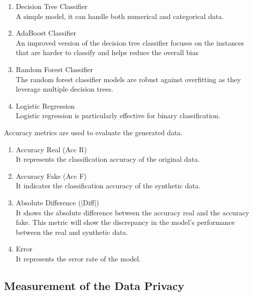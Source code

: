 \begin{enumerate}
    \item Decision Tree Classifier \\
    A simple model, it can handle both numerical and categorical data.

    \item AdaBoost Classifier \\
    An improved version of the decision tree classifier focuses on the instances that are harder to classify and helps reduce the overall bias

    \item Random Forest Classifier \\
    The random forest classifier models are robust against overfitting as they leverage multiple decision trees.

    \item Logistic Regression \\
    Logistic regression is particularly effective for binary classification.
\end{enumerate}

\noindent Accuracy metrics are used to evaluate the generated data.

\begin{enumerate}
    \item Accuracy Real  (Acc R) \\
    It represents the classification accuracy of the original data. 

    \item Accuracy Fake (Acc F) \\
    It indicates the classification accuracy of the synthetic data.

    \item Absolute Difference ($|$Diff$|$) \\
    It shows the absolute difference between the accuracy real and the accuracy fake. This metric will show the discrepancy in the model's performance between the real and synthetic data.

    \item Error \\
    It represents the error rate of the model.
    
\end{enumerate}

\subsection{Measurement of the Data Privacy}


